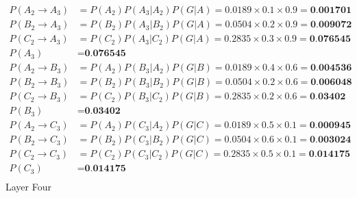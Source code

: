 \documentclass[a4paper]{article}
\begin{document}
\begin{align*}
    P(A_2 \rightarrow A_3) &= P(A_2) P(A_3 | A_2) P(G | A) = 0.0189 \times 0.1 \times 0.9 = \textbf{0.001701} \\
    P(B_2 \rightarrow A_3) &= P(B_2) P(A_3 | B_2) P(G | A) = 0.0504 \times 0.2 \times 0.9 = \textbf{0.009072} \\
    P(C_2 \rightarrow A_3) &= P(C_2) P(A_3 | C_2) P(G  | A) = 0.2835 \times 0.3 \times 0.9= \textbf{0.076545} \\
    P(A_3) &= \textbf{0.076545}\\
    P(A_2 \rightarrow B_3) &= P(A_2) P(B_3 | A_2) P(G | B) = 0.0189 \times 0.4 \times 0.6 = \textbf{0.004536} \\
    P(B_2 \rightarrow B_3) &= P(B_2) P(B_3 | B_2) P(G | B) = 0.0504 \times 0.2 \times 0.6 = \textbf{0.006048} \\
    P(C_2 \rightarrow B_3) &= P(C_2) P(B_3 | C_2) P(G | B) = 0.2835 \times 0.2 \times 0.6 = \textbf{0.03402} \\
    P(B_3) &= \textbf{0.03402}\\
    P(A_2 \rightarrow C_3) &= P(A_2) P(C_3 | A_2) P(G | C) = 0.0189 \times 0.5 \times 0.1 = \textbf{0.000945}\\
    P(B_2 \rightarrow C_3) &= P(B_2) P(C_3 | B_2) P(G | C) = 0.0504 \times 0.6 \times 0.1 = \textbf{0.003024}\\
    P(C_2 \rightarrow C_3) &= P(C_2) P(C_3 | C_2) P(G | C) = 0.2835 \times 0.5 \times 0.1 = \textbf{0.014175}\\
    P(C_3) &= \textbf{0.014175}\\
\end{align*}
Layer Four\\
\end{document}

